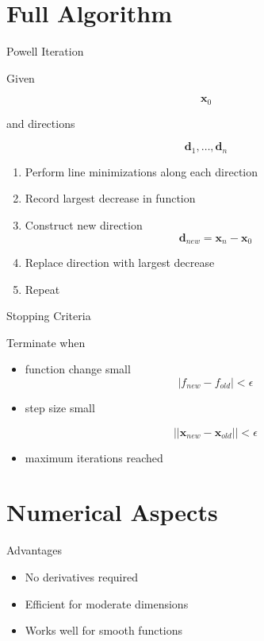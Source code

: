 \documentclass{beamer}
\begin{document}
\section{Full Algorithm}

\begin{frame}{Powell Iteration}

Given

\[
\mathbf{x}_0
\]

and directions

\[
\mathbf{d}_1,\dots,\mathbf{d}_n
\]

\begin{enumerate}
\item Perform line minimizations along each direction
\item Record largest decrease in function
\item Construct new direction
\[
\mathbf{d}_{new} = \mathbf{x}_n - \mathbf{x}_0
\]
\item Replace direction with largest decrease
\item Repeat
\end{enumerate}
\end{frame}

\begin{frame}{Stopping Criteria}

Terminate when

\begin{itemize}
\item function change small
\[
|f_{new}-f_{old}| < \epsilon
\]

\item step size small

\[
||\mathbf{x}_{new}-\mathbf{x}_{old}|| < \epsilon
\]

\item maximum iterations reached
\end{itemize}
\end{frame}

\section{Numerical Aspects}

\begin{frame}{Advantages}

\begin{itemize}
\item No derivatives required
\item Efficient for moderate dimensions
\item Works well for smooth functions
\end{itemize}
\end{frame}
\end{document}
